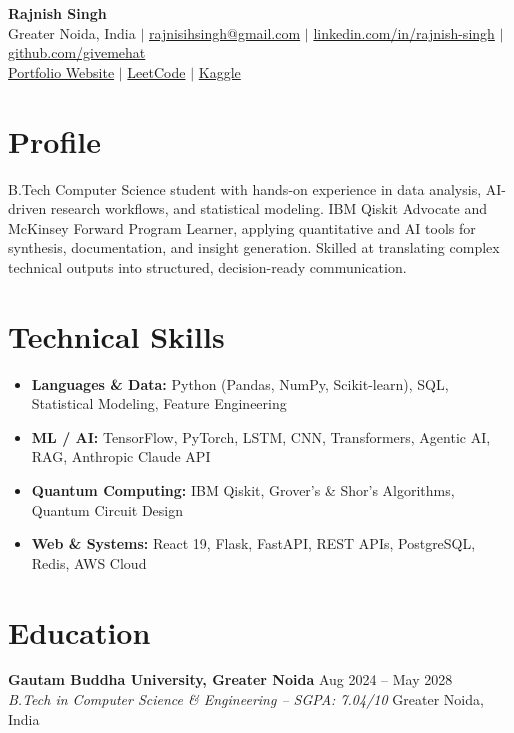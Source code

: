 \documentclass[9.5pt,letterpaper]{article}
\newenvironment{resumeItemize}{
  \begin{itemize}[leftmargin=0.14in, itemsep=0pt, parsep=0pt, topsep=1pt, partopsep=0pt, label=\textbullet]
}{\end{itemize}}
\newcommand{\resumeItem}[1]{\item \small #1}
\newcommand{\resumeHeading}[2]{
  \noindent\textbf{\small #1} \hfill \small #2 \\[0pt]
}
\newcommand{\resumeSub}[2]{
  \noindent\textit{\small #1} \hfill \small #2 \\[1pt]
}
\begin{document}
\begin{center}
    {\LARGE \bfseries Rajnish Singh} \\[4pt]
    \small
    Greater Noida, India \; $|$ \; 
    \faEnvelope \; \href{mailto:rajnisihsingh@gmail.com}{rajnisihsingh@gmail.com} \; $|$ \;
    \faLinkedin \; \href{https://linkedin.com/in/rajnish-singh-a9a61022a}{linkedin.com/in/rajnish-singh} \; $|$ \;
    \faGithub \; \href{https://github.com/givemehat}{github.com/givemehat} \\[2pt]
    \faGlobe \; \href{https://givemehat.github.io/portfolio-website/}{Portfolio Website} \; $|$ \;
    \faCode \; \href{https://leetcode.com/u/singh_r_rajnish/}{LeetCode} \; $|$ \;
    \faKaggle \; \href{https://www.kaggle.com/sirrajnish}{Kaggle}
\end{center}
\vspace{-4pt}

\section*{Profile}
\small B.Tech Computer Science student with hands-on experience in data analysis, AI-driven research workflows, and statistical modeling. IBM Qiskit Advocate and McKinsey Forward Program Learner, applying quantitative and AI tools for synthesis, documentation, and insight generation. Skilled at translating complex technical outputs into structured, decision-ready communication.

\section*{Technical Skills}
\begin{resumeItemize}
  \resumeItem{\textbf{Languages \& Data:} Python (Pandas, NumPy, Scikit-learn), SQL, Statistical Modeling, Feature Engineering}
  \resumeItem{\textbf{ML / AI:} TensorFlow, PyTorch, LSTM, CNN, Transformers, Agentic AI, RAG, Anthropic Claude API}
  \resumeItem{\textbf{Quantum Computing:} IBM Qiskit, Grover's \& Shor's Algorithms, Quantum Circuit Design}
  \resumeItem{\textbf{Web \& Systems:} React 19, Flask, FastAPI, REST APIs, PostgreSQL, Redis, AWS Cloud}
\end{resumeItemize}

\section*{Education}
\resumeHeading{Gautam Buddha University, Greater Noida}{Aug 2024 -- May 2028}
\resumeSub{B.Tech in Computer Science \& Engineering -- SGPA: 7.04/10}{Greater Noida, India}
\end{document}

